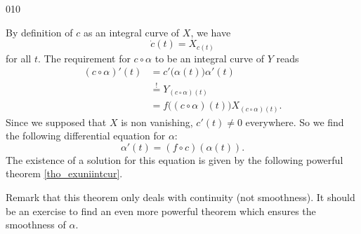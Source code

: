 \begin{corrige}{010}

By definition of $c$ as an integral curve of $X$, we have
\[ 
  \dot c(t)=X_{c(t)}
\]
for all $t$.
The requirement for $c\circ\alpha$ to be an integral curve of $Y$ reads
\begin{equation}
\begin{split}
(c\circ\alpha)'(t)&=c'\big( \alpha(t) \big)\alpha'(t)\\
		&\stackrel{!}{=}Y_{(c\circ\alpha)(t)}\\
		&=f\big( (c\circ\alpha)(t) \big)X_{(c\circ\alpha)(t)}.
\end{split}
\end{equation}
Since we supposed that $X$ is non vanishing, $c'(t)\neq 0$ everywhere. So we find the following differential equation for $\alpha$:
\begin{equation}
\alpha'(t)=(f\circ c)(\alpha(t)).
\end{equation}
The existence of a solution for this equation is given by the following powerful theorem \ref{tho_exuniintcur}.

Remark that this theorem only deals with continuity (not smoothness). It should be an exercise to find an even more powerful theorem which ensures the smoothness of $\alpha$.


\end{corrige}
